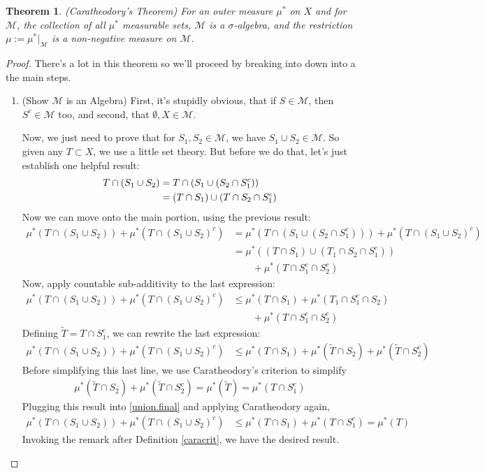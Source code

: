 \documentclass[12pt]{article}
\theoremstyle{plain}
\newtheorem{thm}{Theorem}[subsection]
\theoremstyle{definition}
\theoremstyle{remark}
\begin{document}
\newpage
\begin{thm}
\emph{(Caratheodory's Theorem)} For an outer measure $\mu^*$ on $X$ and for $\mathscr{M}$, the collection of all $\mu^*$ measurable sets, $\mathscr{M}$ is a $\sigma$-algebra, and the restriction $\mu:=\mu^*|_\mathscr{M}$ is a non-negative measure on $\mathscr{M}$.
\end{thm}
\begin{proof}
There's a lot in this theorem so we'll proceed by breaking into down into a the main steps.

\begin{enumerate}
\item (Show $\mathscr{M}$ is an Algebra) First, it's stupidly obvious, that if $S\in\mathscr{M}$, then $S^c\in\mathscr{M}$ too, and second, that $\emptyset, X\in\mathscr{M}$. 

Now, we just need to prove that for $S_1,S_2\in\mathscr{M}$, we have $S_1\cup S_2\in\mathscr{M}$. So given any $T\subset X$, we use a little set theory. But before we do that, let's just establish one helpful result:
\begin{align}
    \label{outmeasmod}
    T\cap (S_1\cup S_2) &=  
    T\cap (S_1\cup (S_2\cap S_1^c)) \notag \\
    &= (T\cap S_1)\cup (T\cap S_2\cap S_1^c) 
\end{align}
Now we can move onto the main portion, using the previous result:
\begin{align*}
    \mu^*(T\cap(S_1\cup S_2)) +
    \mu^*(T\cap(S_1\cup S_2)^c) &=
    \mu^*(T\cap (S_1\cup (S_2\cap S_1^c))) 
    +\mu^*(T\cap(S_1\cup S_2)^c) \\
    &= \mu^*((T\cap S_1)\cup (T_1 \cap S_2\cap S_1^c)) \\
    &\qquad+\mu^*(T\cap S_1^c\cap S_2^c) 
\end{align*}
Now, apply countable sub-additivity to the last expression:
\begin{align*}
    \mu^*(T\cap(S_1\cup S_2)) +
    \mu^*(T\cap(S_1\cup S_2)^c) 
    &\leq\mu^*(T\cap S_1) + \mu^*(T_1\cap S_1^c \cap S_2)\\
    &\qquad+\mu^*(T\cap S_1^c\cap S_2^c) 
\end{align*}
Defining $\tilde{T}=T\cap S_1^c$, we can rewrite the last expression:
\begin{align}
    \label{union.final}
    \mu^*(T\cap(S_1\cup S_2)) +
    \mu^*(T\cap(S_1\cup S_2)^c) 
    &\leq\mu^*(T\cap S_1) + \mu^*(\tilde{T} \cap S_2)
    +\mu^*(\tilde{T}\cap S_2^c) 
\end{align}
Before simplifying this last line, we use Caratheodory's criterion to simplify 
\begin{align*}
    \mu^*(\tilde{T} \cap S_2)
    +\mu^*(\tilde{T}\cap S_2^c) =
    \mu^*(\tilde{T}) = \mu^*(T\cap S_1^c)
\end{align*}
Plugging this result into \ref{union.final} and applying Caratheodory again,
\begin{align*}
    \mu^*(T\cap(S_1\cup S_2)) +
    \mu^*(T\cap(S_1\cup S_2)^c) 
    &\leq\mu^*(T\cap S_1) 
    + \mu^*(T\cap S_1^c) 
    =\mu^*(T)
\end{align*}
Invoking the remark after Definition \ref{caracrit}, we have the desired result.


\end{enumerate}
\end{proof}
\end{document}
